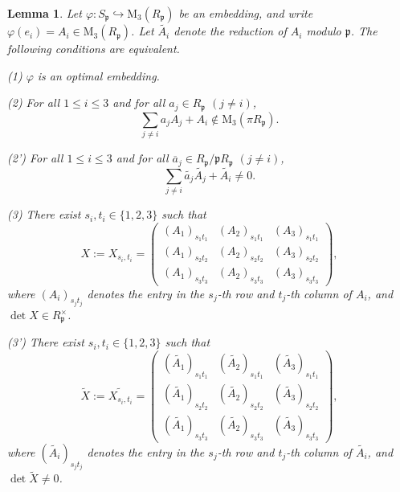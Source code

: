 \documentclass[10pt,a4paper]{amsart}
\newtheorem{lemma}{Lemma}
\begin{document}
\begin{lemma}\label{optimal}
Let $\varphi : S_\mathfrak{p} \hookrightarrow \mathrm{M}_3(R_\mathfrak{p})$ be an embedding, and write $\varphi(e_i)=A_i \in \mathrm{M}_3(R_\mathfrak{p})$. Let $\widetilde{A_i}$ denote the reduction of $A_i$ modulo $\mathfrak{p}$. The following conditions are equivalent.

(1) $\varphi$ is an optimal embedding.

(2) For all $1 \le i \le 3$ and for all $a_j \in R_\mathfrak{p}$ $(j \ne i)$,
$$\sum_{j \ne i} a_j A_j + A_i \notin \mathrm{M}_3(\pi R_\mathfrak{p}).$$

(2') For all $1 \le i \le 3$ and for all $\overline{a}_j \in R_\mathfrak{p}/\mathfrak{p}R_\mathfrak{p}$ $(j \ne i)$,
$$\sum_{j \ne i} \widetilde{a_j} \widetilde{A_j} + \widetilde{A_i} \ne 0.$$

(3) There exist $s_i, t_i \in \{1,2,3\}$ such that $$X := X_{s_i,t_i} =
\begin{pmatrix}
(A_1)_{s_1 t_1} & (A_2)_{s_1 t_1} & (A_3)_{s_1 t_1} \\
(A_1)_{s_2 t_2} & (A_2)_{s_2 t_2} & (A_3)_{s_2 t_2} \\
(A_1)_{s_3 t_3} & (A_2)_{s_3 t_3} & (A_3)_{s_3 t_3}
\end{pmatrix},$$
where $(A_i)_{s_j t_j}$ denotes the entry in the $s_j$-th row and $t_j$-th column of $A_i$, and $\det X \in R_\mathfrak{p}^\times$.

(3') There exist $s_i, t_i \in \{1,2,3\}$ such that $$\widetilde{X} := \widetilde{X_{s_i,t_i}} =
\begin{pmatrix}
(\widetilde{A_1})_{s_1 t_1} & (\widetilde{A_2})_{s_1 t_1} & (\widetilde{A_3})_{s_1 t_1} \\
(\widetilde{A_1})_{s_2 t_2} & (\widetilde{A_2})_{s_2 t_2} & (\widetilde{A_3})_{s_2 t_2} \\
(\widetilde{A_1})_{s_3 t_3} & (\widetilde{A_2})_{s_3 t_3} & (\widetilde{A_3})_{s_3 t_3}
\end{pmatrix},$$
where $(\widetilde{A_i})_{s_j t_j}$ denotes the entry in the $s_j$-th row and $t_j$-th column of $\widetilde{A_i}$, and $\det \widetilde{X} \ne 0$.
\end{lemma}
\end{document}
